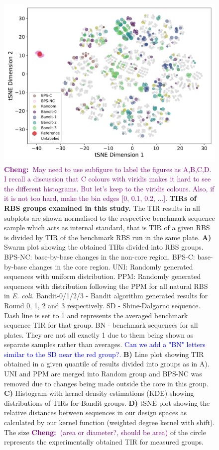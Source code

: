 \documentclass{article}
\newcommand{\cheng}[1]{\textcolor{purple}{{\bf Cheng:~}#1}}
\newcommand{\maciej}[1]{\textcolor{blue}{#1}}
\begin{document}
\begin{figure}[!ht]
    \includegraphics[scale=0.4]{plots/Main_Paper/tsneplot.pdf}
    \caption{\cheng{May need to use subfigure to label the figures as A,B,C,D. I recall a discussion that C colours with viridis makes it hard to see the different histograms. But let's keep to the viridis colours. Also, if it is not too hard, make the bin edges [0, 0.1, 0.2, ...].}
    \textbf{TIRs of RBS groups examined in this study.} 
    The TIR results in all subplots are shown normalised to the respective benchmark sequence sample which acts as internal standard, that is TIR of a given RBS is divided by TIR of the benchmark RBS run in the same plate. 
    \textbf{A)} Swarm plot showing the obtained TIRs divided into RBS groups.
    BPS-NC: base-by-base changes in the non-core region. 
    BPS-C: base-by-base changes in the core region. 
    UNI: Randomly generated sequences with uniform distribution. 
    PPM: Randomly generated sequences with distribution following the PPM for all natural RBS in \emph{E. coli}. 
    Bandit-0/1/2/3 - Bandit algorithm generated results for Round 0, 1, 2 and 3 respectively.
    SD - Shine-Dalgarno sequence.
    Dash line is set to 1 and represents the averaged benchmark sequence TIR for that group. 
    BN - benchmark sequences for all plates. 
    They are not all exactly 1 due to them being shown as separate samples rather than averages.
    \maciej{Can we add a "BN" letters similar to the SD near the red group?.}
    \textbf{B)} Line plot showing TIR obtained in a given quantile of results divided into groups as in A).
    UNI and PPM are merged into Random group and BPS-NC was removed due to changes being made outside the core in this group. 
        \textbf{C)} Histogram with kernel density estimations (KDE) showing distributions of TIRs for Bandit groups.
    \textbf{D)} tSNE plot showing the relative distances between sequences in our design spaces as calculated by our kernel function (weighted degree kernel with shift). The size \cheng{(area or diameter?, should be area)} of the circle represents the experimentally obtained TIR for measured groups.}
    \label{fig: Swarmplot and Quantplot}
\end{figure}
\end{document}

